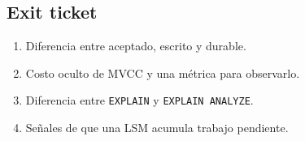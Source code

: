 \documentclass[variant=guia,cover=institutional,mode=print]{ua-engineering-v6-article}
\begin{document}
\subsection*{Exit ticket}

\begin{enumerate}
\item Diferencia entre aceptado, escrito y durable.
\item Costo oculto de MVCC y una métrica para observarlo.
\item Diferencia entre \texttt{EXPLAIN} y \texttt{EXPLAIN ANALYZE}.
\item Señales de que una LSM acumula trabajo pendiente.
\end{enumerate}
\end{document}
